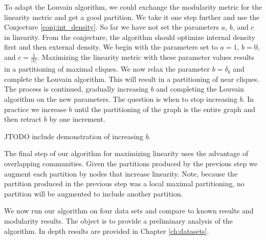 \documentclass[phd,tocprelim]{cornell}
\begin{document}
To adapt the Louvain algorithm, we could exchange the modularity metric for the linearity metric and get a good partition.  We take it one step further and use the Conjecture \ref{conj:int_density}.  So far we have not set the parameters $a$, $b$, and $c$ in linearity.  From the conjecture, the algorithm should optimize internal density first and then external density.  We begin with the parameters set to $a = 1$, $b = 0$, and $c = \frac{1}{ |V|}$.  Maximizing the linearity metric with these parameter values results in a partitioning of maximal cliques.  We now relax the parameter $b = \delta_b$ and complete the Louvain algorithm.  This will result in a partitioning of near cliques.  The process is continued, gradually increasing $b$ and completing the Louvain algorithm on the new parameters.  The question is when to stop increasing $b$.  In practice we increase $b$ until the partitioning of the graph is the entire graph and then retract $b$ by one increment.

JTODO include demonstration of increasing $b$.




The final step of our algorithm for maximizing linearity uses the advantage of overlapping communities.  Given the partitions produced by the previous step we augment each partition by nodes that increase linearity.  Note, because the partition produced in the previous step was a local maximal partitioning, no partition will be augmented to include another partition.

We now run our algorithm on four data sets and compare to known results and modularity results.  The object is to provide a preliminary analysis of the algorithm.  In depth results are provided in Chapter \ref{ch:datasets}.
\end{document}

